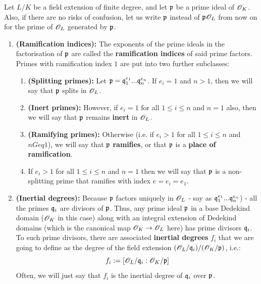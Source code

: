                 \begin{definition} \label{def: ramification_indices}
                    Let $L/K$ be a field extension of finite degree, and let $\mathfrak{p}$ be a prime ideal of $\mathscr{O}_K$. Also, if there are no risks of confusion, let us write $\mathfrak{p}$ instead of $\mathfrak{p}\mathscr{O}_L$ from now on for the prime of $\mathscr{O}_L$ generated by $\mathfrak{p}$.
                        \begin{enumerate}
                            \item \textbf{(Ramification indices):} The exponents of the prime ideals in the factorisation of $\mathfrak{p}$ are called the \textbf{ramification indices} of said prime factors. Primes with ramification index $1$ are put into two further subclasses:
                                \begin{enumerate}
                                    \item \textbf{(Splitting primes):} Let $\mathfrak{p} = \mathfrak{q}_1^{e_1}...\mathfrak{q}_n^{e_n}$. If $e_i = 1$ and $n > 1$, then we will say that $\mathfrak{p}$ splits in $\mathscr{O}_L$.
                                    \item \textbf{(Inert primes):} However, if $e_i = 1$ for all $1 \leq i \leq n$ and $n = 1$ also, then we will say that $\mathfrak{p}$ remains \textbf{inert} in $\mathscr{O}_L$.
                                    \item \textbf{(Ramifying primes):} Otherwise (i.e. if $e_i > 1$ for all $1 \leq i \leq n$ and $n Geq 1$), we will say that $\mathfrak{p}$ \textbf{ramifies}, or that $\mathfrak{p}$ is a \textbf{place of ramification}.
                                    \item If $e_i > 1$ for all $1 \leq i \leq n$ and $n = 1$ then we will say that $\mathfrak{p}$ is a non-splitting prime that ramifies with index $e = e_i = e_1$.
                                \end{enumerate}
                            \item \textbf{(Inertial degrees):} Because $\mathfrak{p}$ factors uniquely in $\mathscr{O}_L$ - say as $\mathfrak{q}_1^{e_1}...\mathfrak{q}_n^{e_n}$) - all the primes $\mathfrak{q}_i$ are divisors of $\mathfrak{p}$. Thus, any prime ideal $\mathfrak{p}$ in a base Dedekind domain ($\mathscr{O}_K$ in this case) along with an integral extension of Dedekind domains (which is the canonical map $\mathscr{O}_K \to \mathscr{O}_L$ here) has prime divisors $\mathfrak{q}_i$. To such prime divisors, there are associated \textbf{inertial degrees} $f_i$ that we are going to define as the degree of the field extension $(\mathscr{O}_L/\mathfrak{q}_i)/(\mathscr{O}_K/\mathfrak{p})$, i.e.:
                                $$f_i := [\mathscr{O}_L/\mathfrak{q}_i : \mathscr{O}_K/\mathfrak{p}]$$
                            Often, we will just say that $f_i$ is the inertial degree of $\mathfrak{q}_i$ over $\mathfrak{p}$.
                        \end{enumerate}
                \end{definition}
                
